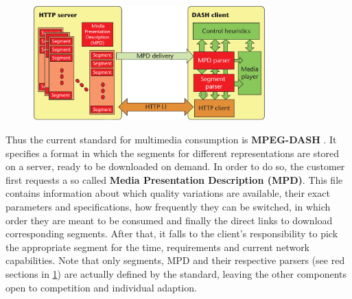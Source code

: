   \begin{figure}[ht]
  	\centering
  	\includegraphics[width=0.8\textwidth]{figures/DASH_scope.png}
  	\label{fig:dash:DASH_scope}
  \end{figure}

Thus the current standard for multimedia consumption is \textbf{MPEG-DASH} \cite{Soda11}. It specifies a format in which the segments for different representations are stored on a server, ready to be downloaded on demand. In order to do so, the customer first requests a so called \textbf{Media Presentation Description (MPD)}. This file contains information about which quality variations are available, their exact parameters and specifications, how frequently they can be switched, in which order they are meant to be consumed and finally the direct links to download corresponding segments. After that, it falls to the client's responsibility to pick the appropriate segment for the time, requirements and current network capabilities. Note that only segments, MPD and their respective parsers (see red sections in \ref{fig:dash:DASH_scope}) are actually defined by the standard, leaving the other components open to competition and individual adaption.


